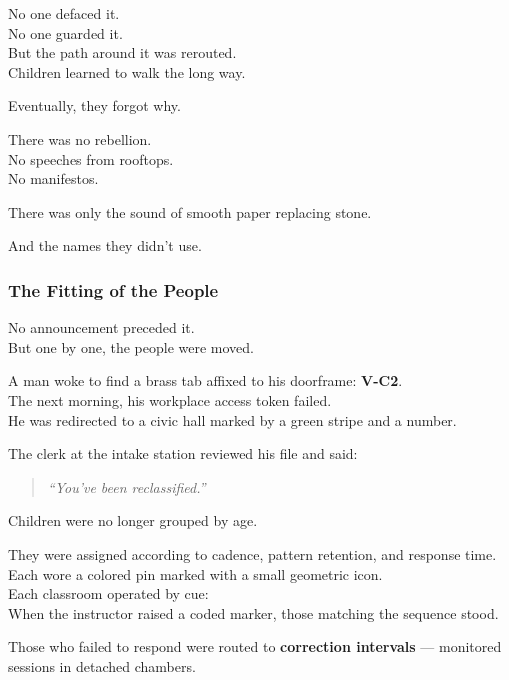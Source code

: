 \documentclass[12pt]{article}
\begin{document}
No one defaced it.\\
No one guarded it.\\
But the path around it was rerouted.\\
Children learned to walk the long way.

Eventually, they forgot why.

\vspace{1em}

There was no rebellion.\\
No speeches from rooftops.\\
No manifestos.

There was only the sound of smooth paper replacing stone.

And the names they didn’t use.

\dotfill

\subsubsection*{The Fitting of the People}

No announcement preceded it.\\
But one by one, the people were moved.

A man woke to find a brass tab affixed to his doorframe: \textbf{V-C2}.\\
The next morning, his workplace access token failed.\\
He was redirected to a civic hall marked by a green stripe and a number.

The clerk at the intake station reviewed his file and said:

\begin{quote}
\textit{“You’ve been reclassified.”}
\end{quote}

\vspace{1em}

Children were no longer grouped by age.

They were assigned according to cadence, pattern retention, and response time.\\
Each wore a colored pin marked with a small geometric icon.\\
Each classroom operated by cue:\\
When the instructor raised a coded marker, those matching the sequence stood.

Those who failed to respond were routed to \textbf{correction intervals} — monitored sessions in detached chambers.
\end{document}
